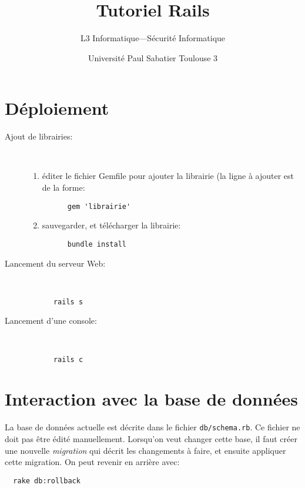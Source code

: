 \documentclass{article}
\title{Tutoriel Rails}
\author{L3 Informatique---Sécurité Informatique}
\date{Université Paul Sabatier Toulouse 3}
\begin{document}
\maketitle

\section{Déploiement}

\begin{description}
\item[Ajout de librairies:] ~\\
  \begin{enumerate}
  \item éditer le fichier Gemfile pour ajouter la librairie (la ligne à ajouter est de la forme:
    \begin{lstlisting}
      gem 'librairie'
    \end{lstlisting}
  \item sauvegarder, et télécharger la librairie:
    \begin{lstlisting}
      bundle install
    \end{lstlisting}
  \end{enumerate}
\item[Lancement du serveur Web:]  ~\\
    \begin{lstlisting}
      rails s
    \end{lstlisting}
\item[Lancement d'une console:]  ~\\
    \begin{lstlisting}
      rails c
    \end{lstlisting}
\end{description}


\section{Interaction avec la base de données}

La base de données actuelle est décrite dans le fichier
\texttt{db/schema.rb}.  Ce fichier ne doit pas être édité
manuellement. Lorsqu'on veut changer cette base, il faut créer une
nouvelle \emph{migration} qui décrit les changements à faire, et
ensuite appliquer cette migration. On peut revenir en arrière avec:
\begin{lstlisting}
  rake db:rollback
\end{lstlisting}
\end{document}
